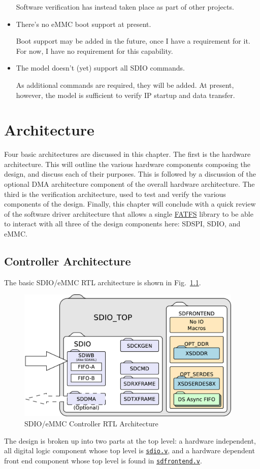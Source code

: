 \documentclass{gqtekspec}
\newcommand{\zhref}[2]{\href{#1}{\textcolor{dkblue}{#2}}}
\begin{document}
\begin{itemize}
	Software verification has instead taken place as part of other
	projects.

\item There's no eMMC boot support at present.

	Boot support may be added in the future, once I have a requirement
	for it.  For now, I have no requirement for this capability.

\item The model doesn't (yet) support all SDIO commands.

	As additional commands are required, they will be added.  At present,
	however, the model is sufficient to verify IP startup and data
	transfer.
\end{itemize}
\chapter{Architecture}\label{ch:arch}
Four basic architectures are discussed in this chapter.  The first is the
hardware architecture.  This will outline the various hardware components
composing the design, and discuss each of their purposes.  This is followed by
a discussion of the optional DMA architecture component of the overall
hardware architecture.  The third is the verification architecture, used to
test and verify the various components of the design.  Finally, this chapter
will conclude with a quick review of the software driver architecture that
allows a single \zhref{http://elm-chan.org/fsw/ff/}{FATFS} library to be able
to interact with all three of the design components here: SDSPI, SDIO, and eMMC.

\section{Controller Architecture}\label{sec:arch-controller}

The basic SDIO/eMMC RTL architecture is shown in Fig.~\ref{fig:sdioblocks}.
\begin{figure}\begin{center}
\includegraphics[height=2.5in]{gfx/sdioblocks.eps}
\caption{SDIO/eMMC Controller RTL Architecture}\label{fig:sdioblocks}
\end{center}\end{figure}
The design is broken up into two parts at the top level: a hardware independent,
all digital logic component whose top level is \zhref{../rtl/sdio.v}{\tt sdio.v},
and a hardware dependent front end component whose top level is found in
\zhref{../rtl/sdfrontend.v}{\tt sdfrontend.v}.
\end{document}
